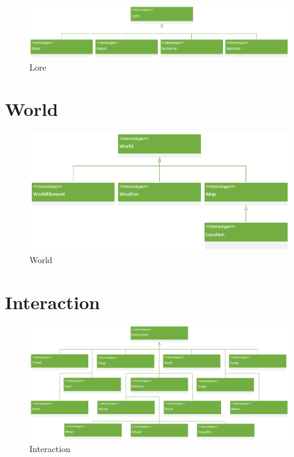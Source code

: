 \begin{figure}[H]
    \begin{center}
    \includegraphics[width=15cm]{10_img/Z_annexeA/lore.PNG}
    \caption{Lore}
    \label{A-Lore}
    \end{center}
\end{figure}


\section{World}
\begin{figure}[H]
    \begin{center}
    \includegraphics[width=14cm]{10_img/Z_annexeA/world.PNG}
    \caption{World}
    \label{A-World}
    \end{center}
\end{figure}


\section{Interaction}
\begin{figure}[H]
    \begin{center}
    \includegraphics[width=\linewidth]{10_img/Z_annexeA/interaction.PNG} 
    \caption{Interaction}
    \label{A-Interaction}
    \end{center}
\end{figure}

